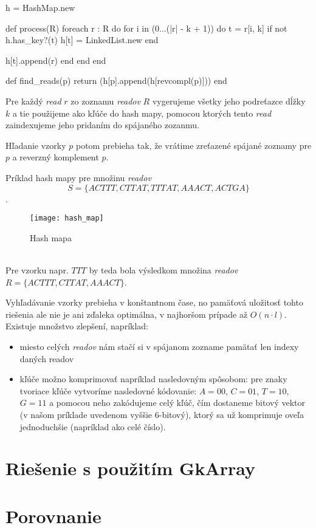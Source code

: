 \begin{pseudocode}[label=lst:hash_algorithm,caption={Algoritmus na riešenie
problému zarovnania readov pomocou hash mapy}]
h = HashMap.new

def process(R)
  foreach r : R do
    for i in (0...(|r| - k + 1)) do
      t = r[i, k]
      if not h.has_key?(t)
        h[t] = LinkedList.new
      end
        
      h[t].append(r)
    end 
  end
end

def find_reads(p)
  return (h[p].append(h[revcompl(p)]))
end
\end{pseudocode}

Pre každý \emph{read} $r$ zo zoznamu \emph{readov} $R$ vygerujeme všetky jeho
podreťazce dĺžky $k$ a tie použijeme ako kľúče do hash mapy, pomocou ktorých
tento \emph{read} zaindexujeme jeho pridaním do spájaného zozanmu.

Hľadanie vzorky $p$ potom prebieha tak, že vrátime zreťazené spájané
zoznamy pre $p$ a reverzný komplement $p$.

\begin{example}
    Príklad hash mapy pre množinu \emph{readov} $$S = \{ACTTT, CTTAT, TTTAT,
    AAACT, ACTGA\}$$.
    \begin{figure}[h]
        \centering
        \texttt{[image: hash\_map]}
        \caption{Hash mapa}
        \label{fig:hash_map}
    \end{figure}
    \\
    Pre vzorku napr. $TTT$ by teda bola výsledkom množina \emph{readov} $R =
    \{ACTTT, CTTAT, AAACT\}$.
\end{example}

Vyhľadávanie vzorky prebieha v konštantnom čase, no pamäťová uložitosť tohto
riešenia ale nie je ani zďaleka optimálna, v najhoršom prípade až $O(n \cdot
l)$. Existuje množstvo zlepšení, napríklad:

\begin{itemize}
    \item miesto celých \emph{readov} nám stačí si v spájanom zozname
    pamätať len indexy daných readov
    \item kľúče možno komprimovať napríklad nasledovným spôsobom: pre znaky
    tvoriace kľúče vytvoríme nasledovné kódovanie: $A = 00$, $C = 01$, $T = 10$,
    $G = 11$ a pomocou neho zakódujeme celý kľúč, čím dostaneme bitový vektor
    (v našom príklade uvedenom vyššie 6-bitový), ktorý sa už komprimuje oveľa
    jednoduchšie (napríklad ako celé číslo).
\end{itemize}


\section{Riešenie s použitím GkArray}

\section{Porovnanie}